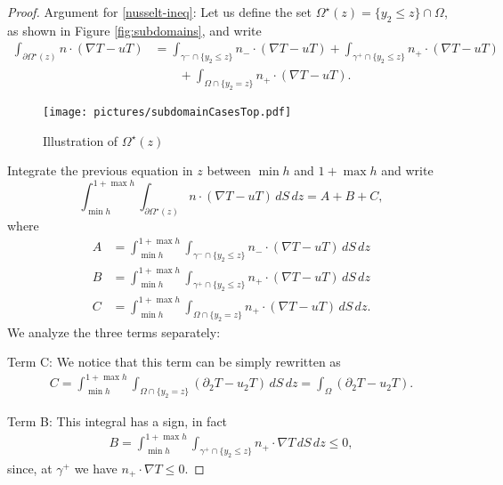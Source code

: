 \documentclass{article}
\theoremstyle{definition}
\theoremstyle{definition}
\newcommand{\gplus}{\gamma^+}
\newcommand{\gminus}{\gamma^-}
\begin{document}
\begin{proof}
Argument for \eqref{nusselt-ineq}: Let us define the set $\Omega^\star(z)=\{y_2\leq z\}\cap \Omega$, as shown in Figure \ref{fig:subdomains}, and write
\begin{align*}
    \int_{\partial\Omega^{\star}(z)}n\cdot (\nabla T-uT)&=\int_{\gminus\cap\{y_2\leq z\}}n_-\cdot (\nabla T-uT)+\int_{\gplus\cap\{y_2\leq z\}}n_+\cdot (\nabla T-uT)
    \\&\qquad+\int_{\Omega\cap\{y_2=z\}}n_+\cdot (\nabla T-uT).
\end{align*}

\begin{figure}
    \begin{center}
        \texttt{[image: pictures/subdomainCasesTop.pdf]}    
    \end{center}
    \caption{Illustration of $\Omega^\star(z)$}
    \label{fig:nusselt-inequality}
\end{figure}
Integrate the previous equation in $z$ between $\min h$ and $1+\max h$ and write
\begin{equation*}
    \int_{\min h}^{1+\max h}\int_{\partial\Omega^{\star}(z)}n\cdot (\nabla T-uT)\, dS\, dz=A+B+C,
\end{equation*}
where 
\begin{align*}
    A&=\int_{\min h}^{1+\max h}\int_{\gminus\cap\{y_2\leq z\}}n_-\cdot (\nabla T-uT)\, dS\, dz\\
    B&=\int_{\min h}^{1+\max h}\int_{\gplus\cap\{y_2\leq z\}}n_+\cdot (\nabla T-uT)\, dS\, dz\\
    C&=\int_{\min h}^{1+\max h}\int_{\Omega\cap\{y_2=z\}}n_+\cdot (\nabla T-uT)\, dS\, dz.
\end{align*}
We analyze the three terms separately: 

Term C: We notice that this term can be simply rewritten as
\begin{align*}
    C=\int_{\min h}^{1+\max h}\int_{\Omega\cap\{y_2=z\}} (\partial_2 T-u_2T)\, dS\, dz=\int_{\Omega} (\partial_2T-u_2T).
\end{align*}

Term B: This integral has a sign, in fact
\begin{align*}
    B=\int_{\min h}^{1+\max h}\int_{\gplus\cap\{y_2\leq z\}}n_+\cdot \nabla T\, dS\, dz\leq 0,  
\end{align*}
since, at $\gamma^+$ we have $n_+\cdot \nabla T\leq 0$.


\end{proof}
\end{document}

